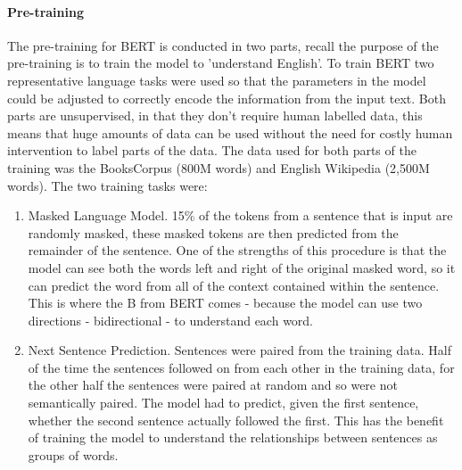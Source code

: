 \paragraph{Pre-training} The pre-training for BERT is conducted in two parts, recall the purpose of the pre-training is to train the model to 'understand English'. To train BERT two representative language tasks were used so that the parameters in the model could be adjusted to correctly encode the information from the input text. Both parts are unsupervised, in that they don't require human labelled data, this means that huge amounts of data can be used without the need for costly human intervention to label parts of the data. The data used for both parts of the training was the BooksCorpus (800M words) and English Wikipedia (2,500M words). The two training tasks were:

\begin{enumerate}
    \item Masked Language Model. 15\% of the tokens from a sentence that is input are randomly masked, these masked tokens are then predicted from the remainder of the sentence. One of the strengths of this procedure is that the model can see both the words left and right of the original masked word, so it can predict the word from all of the context contained within the sentence. This is where the B from BERT comes - because the model can use two directions - bidirectional - to understand each word. 
    
    \item Next Sentence Prediction. Sentences were paired from the training data. Half of the time the sentences followed on from each other in the training data, for the other half the sentences were paired at random and so were not semantically paired.  The model had to predict, given the first sentence, whether the second sentence actually followed the first. This has the benefit of training the model to understand the relationships between sentences as groups of words.
    
\end{enumerate}

